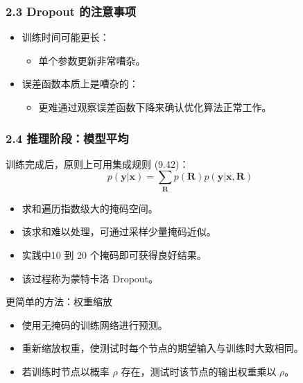 \documentclass[t,aspectratio=169]{beamer} %
\begin{document}
\begin{frame}
    \frametitle{2.3 Dropout 的注意事项}
    \begin{itemize}
        \item \alert{训练时间可能更长}：
        \begin{itemize}
            \item 单个参数更新\alert{非常嘈杂}。
        \end{itemize}
        \item \alert{误差函数本质上是嘈杂的}：
        \begin{itemize}
            \item 更难通过观察误差函数下降来确认优化算法正常工作。
        \end{itemize}
    \end{itemize}
\end{frame}

\begin{frame}
    \frametitle{2.4 推理阶段：模型平均}
    训练完成后，原则上可用集成规则 (9.42)：
    \begin{equation}
        p(\mathbf{y}|\mathbf{x}) = \sum_{\mathbf{R}} p(\mathbf{R}) p(\mathbf{y}|\mathbf{x}, \mathbf{R})
        \tag{9.51}
    \end{equation}
    \begin{itemize}
        \item 求和遍历\alert{指数级大的掩码空间}。
        \item 该求和\alert{难以处理}，可通过采样少量掩码近似。
        \item 实践中\alert{10 到 20 个掩码}即可获得良好结果。
        \item 该过程称为\alert{蒙特卡洛 Dropout}。
    \end{itemize}
    \begin{block}{更简单的方法：权重缩放}
        \begin{itemize}
            \item 使用\alert{无掩码}的训练网络进行预测。
            \item \alert{重新缩放权重}，使测试时每个节点的期望输入与训练时大致相同。
            \item 若训练时节点以概率 $\rho$ 存在，测试时该节点的输出权重乘以 $\rho$。
        \end{itemize}
    \end{block}
\end{frame}

\end{document}
